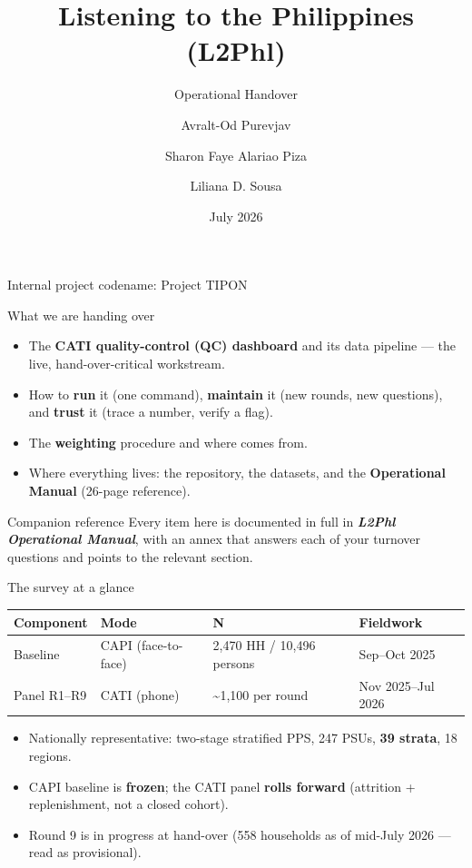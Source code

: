 \documentclass[aspectratio=169,11pt]{beamer}
\title{Listening to the Philippines (L2Phl)}
\subtitle{Operational Handover}
\author{Avralt-Od Purevjav \and Sharon Faye Alariao Piza \and Liliana D. Sousa}
\institute{World Bank -- Poverty and Equity Global Practice}
\date{July 2026}
\newcommand{\code}[1]{{\ttfamily\small\detokenize{#1}}}
\begin{document}
\begin{frame}[plain]
  \titlepage
  \begin{center}\small\color{wbgrey}Internal project codename: Project TIPON\end{center}
\end{frame}

\begin{frame}{What we are handing over}
  \begin{itemize}
    \item The \textbf{CATI quality-control (QC) dashboard} and its data pipeline --- the live, hand-over-critical workstream.
    \item How to \textbf{run} it (one command), \textbf{maintain} it (new rounds, new questions), and \textbf{trust} it (trace a number, verify a flag).
    \item The \textbf{weighting} procedure and where \code{target_hh_imputed.dta} comes from.
    \item Where everything lives: the repository, the datasets, and the \textbf{Operational Manual} (26-page reference).
  \end{itemize}
  \vfill
  \begin{block}{Companion reference}
  Every item here is documented in full in \textbf{\itshape L2Phl Operational Manual}, with an annex that answers each of your turnover questions and points to the relevant section.
  \end{block}
\end{frame}

\begin{frame}{The survey at a glance}
  \small
  \begin{center}
  \begin{tabular}{@{}llll@{}}
    \toprule
    \textbf{Component} & \textbf{Mode} & \textbf{N} & \textbf{Fieldwork}\\
    \midrule
    Baseline & CAPI (face-to-face) & 2,470 HH / 10,496 persons & Sep--Oct 2025\\
    Panel R1--R9 & CATI (phone) & \textasciitilde1,100 per round & Nov 2025--Jul 2026\\
    \bottomrule
  \end{tabular}
  \end{center}
  \vspace{0.5em}
  \begin{itemize}
    \item Nationally representative: two-stage stratified PPS, 247 PSUs, \textbf{39 strata}, 18 regions.
    \item CAPI baseline is \textbf{frozen}; the CATI panel \textbf{rolls forward} (attrition + replenishment, not a closed cohort).
    \item Round 9 is in progress at hand-over (558 households as of mid-July 2026 --- read as provisional).
  \end{itemize}
\end{frame}
\end{document}
